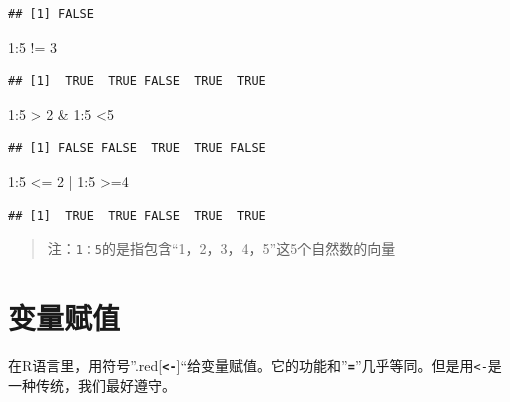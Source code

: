 \documentclass[
]{book}
\newenvironment{Shaded}{\begin{snugshade}}{\end{snugshade}}
\newcommand{\DecValTok}[1]{\textcolor[rgb]{0.00,0.00,0.81}{#1}}
\newcommand{\SpecialCharTok}[1]{\textcolor[rgb]{0.00,0.00,0.00}{#1}}
\begin{document}
\begin{verbatim}
## [1] FALSE
\end{verbatim}

\begin{Shaded}
\begin{Highlighting}[]
\DecValTok{1}\SpecialCharTok{:}\DecValTok{5} \SpecialCharTok{!=} \DecValTok{3}
\end{Highlighting}
\end{Shaded}

\begin{verbatim}
## [1]  TRUE  TRUE FALSE  TRUE  TRUE
\end{verbatim}

\begin{Shaded}
\begin{Highlighting}[]
\DecValTok{1}\SpecialCharTok{:}\DecValTok{5} \SpecialCharTok{\textgreater{}} \DecValTok{2} \SpecialCharTok{\&} \DecValTok{1}\SpecialCharTok{:}\DecValTok{5} \SpecialCharTok{\textless{}}\DecValTok{5}
\end{Highlighting}
\end{Shaded}

\begin{verbatim}
## [1] FALSE FALSE  TRUE  TRUE FALSE
\end{verbatim}

\begin{Shaded}
\begin{Highlighting}[]
\DecValTok{1}\SpecialCharTok{:}\DecValTok{5} \SpecialCharTok{\textless{}=} \DecValTok{2} \SpecialCharTok{|} \DecValTok{1}\SpecialCharTok{:}\DecValTok{5} \SpecialCharTok{\textgreater{}=}\DecValTok{4}
\end{Highlighting}
\end{Shaded}

\begin{verbatim}
## [1]  TRUE  TRUE FALSE  TRUE  TRUE
\end{verbatim}

\begin{quote}
注：\texttt{1：5}的是指包含``1，2，3，4，5''这5个自然数的向量
\end{quote}

\hypertarget{ux53d8ux91cfux8d4bux503c}{%
\section{变量赋值}\label{ux53d8ux91cfux8d4bux503c}}

在R语言里，用符号''.red{[}\textbf{\texttt{\textless{}-}}{]}``给变量赋值。它的功能和''\textbf{\texttt{=}}''几乎等同。但是用\texttt{\textless{}-}是一种传统，我们最好遵守。
\end{document}
